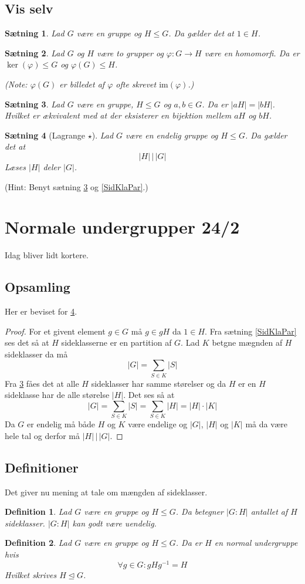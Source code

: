 \documentclass{article}
\newcommand{\inv}{^{-1}}
\newcommand{\too}{\rightarrow}
\newtheorem{setn}{Sætning}
\newtheorem{defi}{Definition}
\begin{document}
		\subsection*{Vis selv}
		\begin{setn}
			Lad $G$ være en gruppe og $H \le G$. Da gælder det at $1 \in H$.
		\end{setn}
		\begin{setn}
			Lad $G$ og $H$ være to grupper og $\varphi: G \too H$ være en homomorfi.
			Da er $\ker(\varphi) \le G$ og $\varphi(G) \le H$.
			
			(Note: $\varphi(G)$ er billedet af $\varphi$ ofte skrevet $\text{im}(\varphi)$.)
		\end{setn}
		\begin{setn} \label{SidKlaStø}
			Lad $G$ være en gruppe, $H \le G$ og $a,b \in G$. Da er $|aH| = |bH|$.
			Hvilket er ækvivalent med at der eksisterer en bijektion mellem $aH$ og $bH$.
		\end{setn}
		\begin{setn}[Lagrange $\star$] \label{Lagrange}
			Lad $G$ være en endelig gruppe og $H \le G$. Da gælder det at
			$$|H| \,\Big|\, |G|$$
			Læses $|H|$ deler $|G|$.
		\end{setn}
		(Hint: Benyt sætning \ref{SidKlaStø} og \ref{SidKlaPar}.)
	\newpage
	\section*{Normale undergrupper 24/2}
		Idag bliver lidt kortere.
		\subsection*{Opsamling}
		Her er beviset for \ref{Lagrange}.
		\begin{proof}
			For et givent element $g \in G$ må $g \in gH$ da $1 \in H$.
			Fra sætning \ref{SidKlaPar} ses det så at $H$ sideklasserne
			er en partition af $G$. Lad $K$ betgne mægnden af $H$ sideklasser da må
			$$|G| = \sum_{S \in K} |S|$$
			Fra \ref{SidKlaStø} fåes det at alle $H$ sideklasser har samme størelser og
			da $H$ er en $H$ sideklasse har de alle størelse $|H|$. Det ses så at
			$$|G| = \sum_{S \in K} |S| = \sum_{S \in K} |H| = |H|\cdot |K|$$
			Da $G$ er endelig må både $H$ og $K$ være endelige og $|G|$, $|H|$ og $|K|$
			må da være hele tal og derfor må $|H| \,\Big|\, |G|$.
		\end{proof}
		\subsection*{Definitioner}
		Det giver nu mening at tale om mængden af sideklasser.
		\begin{defi}
			Lad $G$ være en gruppe og $H \le G$. Da betegner $|G:H|$
			antallet af $H$ sideklasser. $|G:H|$ kan godt være uendelig.
		\end{defi}
		\begin{defi}
			Lad $G$ være en gruppe og $H \le G$. Da er $H$ en normal undergruppe hvis
			$$\forall g \in G: gHg\inv = H$$
			Hvilket skrives $H \unlhd G$.
		\end{defi}
\end{document}
